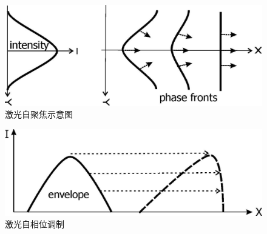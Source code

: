 \begin{figure}[!htbp]
  \centering
  \includegraphics[width=\MyFactor\textwidth]{Img/selffocussing.eps}
  \caption{激光自聚焦示意图}
  \label{fig:selffousing}
\end{figure}

\begin{figure}[!htbp]
  \centering
  \includegraphics[width=\MyFactor\textwidth]{Img/prof-steepening.eps}
  \caption{激光自相位调制}
  \label{fig:phaseModulate}
\end{figure}

